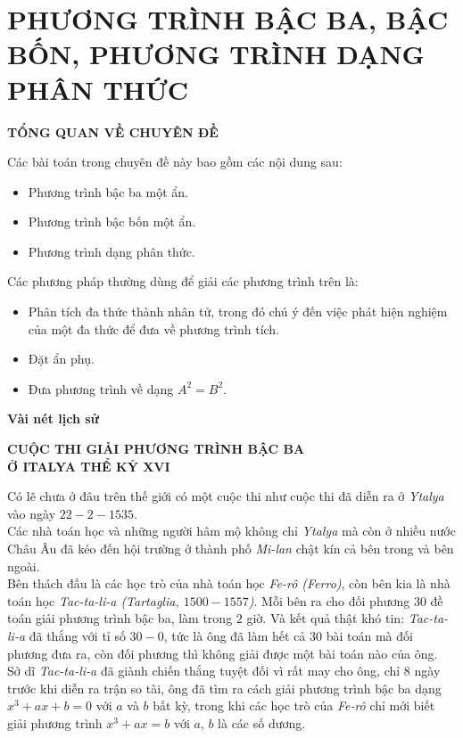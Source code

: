 \section{PHƯƠNG TRÌNH BẬC BA, BẬC BỐN, PHƯƠNG TRÌNH DẠNG PHÂN THỨC}

\begin{center}
 \large \textbf{TỔNG QUAN VỀ CHUYÊN ĐỀ}
\end{center}
Các bài toán trong chuyên đề này bao gồm các nội dung sau:
\begin{itemize}
	\item Phương trình bậc ba một ẩn.
	\item Phương trình bậc bốn một ẩn.
	\item Phương trình dạng phân thức.
\end{itemize}
Các phương pháp thường dùng để giải các phương trình trên là:
\begin{itemize}
	\item Phân tích đa thức thành nhân tử, trong đó chú ý đến việc phát hiện nghiệm của một đa thức để đưa về phương trình tích.
	\item Đặt ẩn phụ.
	\item Đưa phương trình về dạng $A^2 = B^2$.
\end{itemize}
\begin{flushleft}
	\large \textbf{Vài nét lịch sử}
\end{flushleft}
\begin{center}
	\large \textbf{CUỘC THI GIẢI PHƯƠNG TRÌNH BẬC BA \\ Ở ITALYA THỂ KỶ XVI}
\end{center}
\par Có lẽ chưa ở đâu trên thế giới có một cuộc thi như cuộc thi đã diễn ra ở \emph{Ytalya} vào ngày $22 - 2 - 1535$. \\
\indent Các nhà toán học và những người hâm mộ không chỉ \emph{Ytalya} mà còn ở nhiều nước Châu Âu đã kéo đến hội trường ở thành phố \emph{Mi-lan} chật kín cả bên trong và bên ngoài.\\
\indent Bên thách đấu là các học trò của nhà toán học \emph{Fe-rô (Ferro)}, còn bên kia là nhà toán học \emph{Tac-ta-li-a (Tartaglia, $1500 - 1557$)}. Mỗi bên ra cho đối phương $30$ đề toán giải phương trình bậc ba, làm trong $2$ giờ. Và kết quả thật khó tin: \emph{Tac-ta-li-a} đã thắng với tỉ số $30 - 0$, tức là ông đã làm hết cả $30$ bài toán mà đối phương đưa ra, còn đối phương thì không giải được một bài toán nào của ông.\\
\indent Sở dĩ \emph{Tac-ta-li-a} đã giành chiến thắng tuyệt đối vì rất may cho ông, chỉ $8$ ngày trước khi diễn ra trận so tài, ông đã tìm ra cách giải phương trình bậc ba dạng $x^3 + ax + b = 0$ với $a$ và $b$ bất kỳ, trong khi các học trò của \emph{Fe-rô} chỉ mới biết giải phương trình $x^3 + ax = b$ với $a$, $b$ là các số dương.
